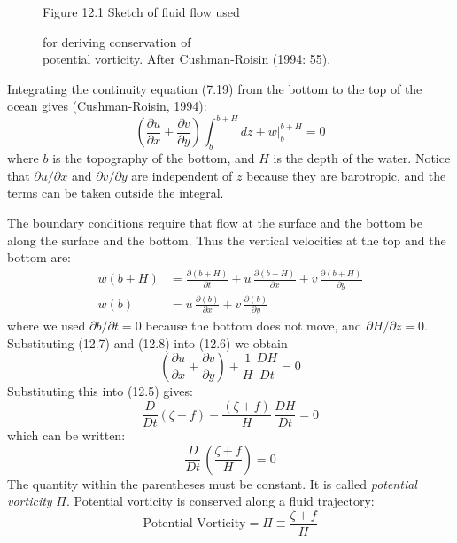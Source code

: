 \begin{figure}[t!]
\centering
{}
\footnotesize
Figure 12.1 Sketch of fluid flow used \rule{0mm}{3ex}for deriving conservation of\\potential vorticity. After Cushman-Roisin (1994: 55).

\label{fig:vorticitysketch}
\vspace{-3ex}
\end{figure}

Integrating the continuity equation (7.19) from the bottom to the top of the ocean gives (Cushman-Roisin, 1994):
\begin{equation}
\left( \frac{\partial{u}}{\partial{x}} + \frac{\partial{v}}{\partial{y}}\right) \int_{b}^{b+H} dz + w \bigr|_{b}^{b+H} = 0
\end{equation}
where $b$ is the topography of the bottom, and $H$ is the depth of the water. Notice that  $\partial{u}/\partial{x}$ and $\partial{v}/\partial{y}$ are independent of $z$ because they are barotropic, and the terms can be taken outside the integral. 

The boundary conditions require that flow at the surface and the bottom be along the surface and the bottom. Thus the vertical velocities at the top and the bottom are:
\begin{align}
w(b+H) &= \frac{\partial{(b+H)}}{\partial{t}} + u\,\frac{\partial{(b+H)}}{\partial{x}}+v\, \frac{\partial{(b+H)}}{\partial{y}} \\
w(b) &= u\,\frac{\partial{(b)}}{\partial{x}}+v\,\frac{\partial{(b)}}{\partial{y}}
\end{align}
where we used $\partial{b}/\partial{t} = 0$ because the bottom does not move, and $\partial{H}/\partial{z} = 0$. Substituting (12.7) and (12.8) into (12.6) we obtain
\begin{displaymath}
\left( \frac{\partial{u}}{\partial{x}} + \frac{\partial{v}}{\partial{y}}\right) + \frac{1}{H}\,\frac{DH}{Dt} = 0
\end{displaymath}
Substituting this into (12.5) gives:
\begin{displaymath}
\frac{D}{Dt}\left(\zeta +f  \right) -\frac{\left(\zeta +f
\right)}{H}\,\frac{DH}{Dt} = 0
\end{displaymath}
which can be written:
\begin{displaymath}
\frac{D }{Dt}\,\left( \frac{\zeta + f}{H} \right) = 0
\end{displaymath}
The quantity within the parentheses must be constant. It is called
\textit{potential vorticity} $\Pi$. Potential
vorticity is conserved along a fluid trajectory:
\begin{equation}
\boxed{\text{Potential Vorticity} = \Pi \equiv \frac{\zeta + f}{H} }
\end{equation}


